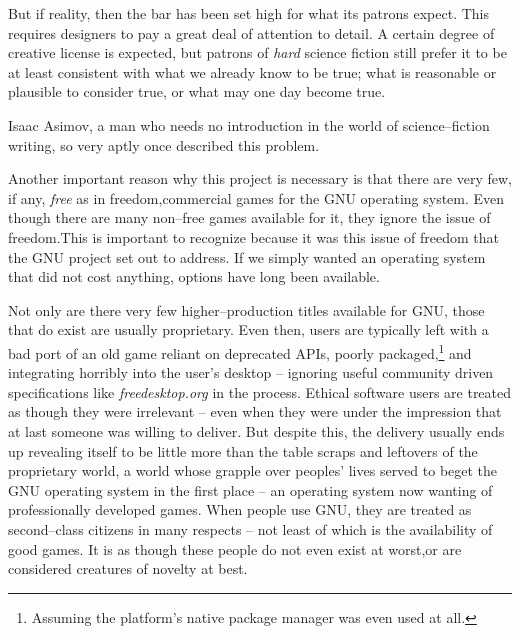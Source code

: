 But if reality, then the bar has been set high for what its patrons expect. This requires designers to pay a great deal of attention to detail. A certain degree of creative license is expected, but patrons of {\it hard} science fiction still prefer it to be at least consistent with what we already know to be true; what is reasonable or plausible to consider true, or what may one day become true.

Isaac Asimov, a man who needs no introduction in the world of science--fiction writing, so very aptly once described this problem. \footnotecite[extras={, p.~73.}][asimov1981]

Another important reason why this project is necessary is that there are very few, if any, {\it free} as in freedom, commercial games for the GNU operating system. Even though there are many non--free games available for it, they ignore the issue of freedom. This is important to recognize because it was this issue of freedom that the GNU project set out to address. If we simply wanted an operating system that did not cost anything, options have long been available.\footnotecite[piratebay]

Not only are there very few higher--production titles available for GNU, those that do exist are usually proprietary. Even then, users are typically left with a bad port of an old game reliant on deprecated APIs, poorly packaged,\footnote{Assuming the platform's native package manager was even used at all.} and integrating horribly into the user's desktop -- ignoring useful community driven specifications like {\it freedesktop.org} in the process. Ethical software users are treated as though they were irrelevant -- even when they were under the impression that at last someone was willing to deliver. But despite this, the delivery usually ends up revealing itself to be little more than the table scraps and leftovers of the proprietary world, a world whose grapple over peoples' lives served to beget the GNU operating system in the first place -- an operating system now wanting of professionally developed games. When people use GNU, they are treated as second--class citizens in many respects -- not least of which is the availability of good games. It is as though these people do not even exist at worst, or are considered creatures of novelty at best. 


